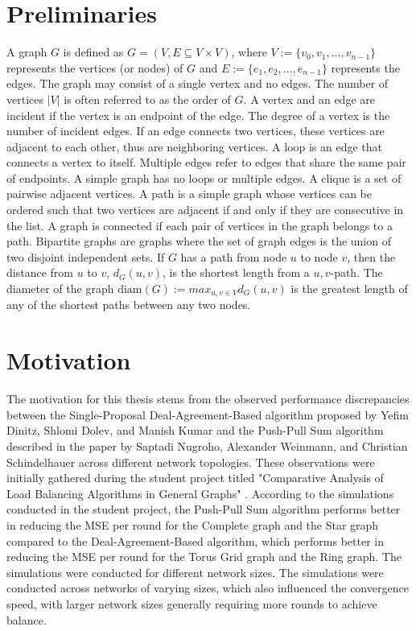 \section{Preliminaries}\label{sec:prelimn}
A graph $G$ is defined as $G = (V, E \subseteq V \times V)$, where $V := \{v_0, v_1,..., v_{n-1}\}$ represents the vertices (or nodes) of $G$ and $E := \{e_1, e_2,...,e_{n-1}\}$ represents the edges. The graph may consist of a single vertex and no edges. The number of vertices $|V|$ is often referred to as the order of $G$. A vertex and an edge are incident if the vertex is an endpoint of the edge. The degree of a vertex is the number of incident edges. If an edge connects two vertices, these vertices are adjacent to each other, thus are neighboring vertices. A loop is an edge that connects a vertex to itself. Multiple edges refer to edges that share the same pair of endpoints. A simple graph has no loops or multiple edges. A clique is a set of pairwise adjacent vertices. A path is a simple graph whose vertices can be ordered such that two vertices are adjacent if and only if they are consecutive in the list. A graph is connected if each pair of vertices in the graph belongs to a path. Bipartite graphs are graphs where the set of graph edges is the union of two disjoint independent sets. If $G$ has a path from node $u$ to node $v$, then the distance from $u$ to $v$, $d_G(u,v)$, is the shortest length from a $u,v$-path. The diameter of the graph $\text{diam} (G) := max_{u,v\in V}d_G(u,v)$ is the greatest length of any of the shortest paths between any two nodes. \cite{GraphTheorySchindelhaauer2021}

\section{Motivation}\label{sec:motivation}
The motivation for this thesis stems from the observed performance discrepancies between the Single-Proposal Deal-Agreement-Based algorithm proposed by Yefim Dinitz, Shlomi Dolev, and Manish Kumar \cite{Dinitz2023DAB} and the Push-Pull Sum algorithm described in the paper by Saptadi Nugroho, Alexander Weinmann, and Christian Schindelhauer \cite{nugroho2023PushPullSumDataAg} across different network topologies. These observations were initially gathered during the student project titled "Comparative Analysis of Load Balancing Algorithms in General Graphs" \cite{Bayazitoglu}. According to the simulations conducted in the student project, the Push-Pull Sum algorithm performs better in reducing the MSE per round for the Complete graph and the Star graph compared to the Deal-Agreement-Based algorithm, which performs better in reducing the MSE per round for the Torus Grid graph and the Ring graph. The simulations were conducted for different network sizes. The simulations were conducted across networks of varying sizes, which also influenced the convergence speed, with larger network sizes generally requiring more rounds to achieve balance.

